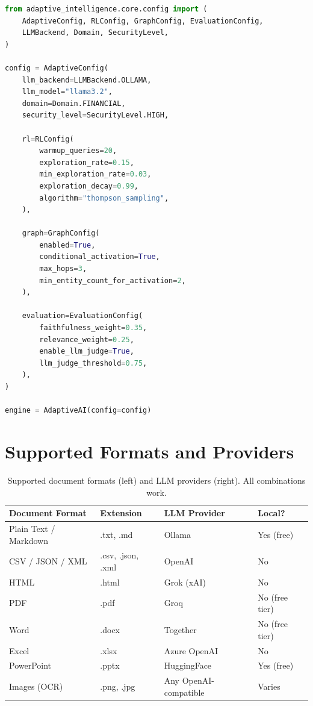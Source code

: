 \documentclass[11pt]{article}
\begin{document}
\begin{lstlisting}[language=Python, caption={Full configuration control (Level 2 access).}]
from adaptive_intelligence.core.config import (
    AdaptiveConfig, RLConfig, GraphConfig, EvaluationConfig,
    LLMBackend, Domain, SecurityLevel,
)

config = AdaptiveConfig(
    llm_backend=LLMBackend.OLLAMA,
    llm_model="llama3.2",
    domain=Domain.FINANCIAL,
    security_level=SecurityLevel.HIGH,
    
    rl=RLConfig(
        warmup_queries=20,
        exploration_rate=0.15,
        min_exploration_rate=0.03,
        exploration_decay=0.99,
        algorithm="thompson_sampling",
    ),
    
    graph=GraphConfig(
        enabled=True,
        conditional_activation=True,
        max_hops=3,
        min_entity_count_for_activation=2,
    ),
    
    evaluation=EvaluationConfig(
        faithfulness_weight=0.35,
        relevance_weight=0.25,
        enable_llm_judge=True,
        llm_judge_threshold=0.75,
    ),
)

engine = AdaptiveAI(config=config)
\end{lstlisting}

\section{Supported Formats and Providers}
\label{app:formats}

\begin{table}[H]
    \centering
    \small
    \begin{tabular}{@{}llll@{}}
        \toprule
        \textbf{Document Format} & \textbf{Extension} & \textbf{LLM Provider} & \textbf{Local?} \\
        \midrule
        Plain Text / Markdown & .txt, .md & Ollama & Yes (free) \\
        CSV / JSON / XML      & .csv, .json, .xml & OpenAI & No \\
        HTML                  & .html & Grok (xAI) & No \\
        PDF                   & .pdf & Groq & No (free tier) \\
        Word                  & .docx & Together & No (free tier) \\
        Excel                 & .xlsx & Azure OpenAI & No \\
        PowerPoint            & .pptx & HuggingFace & Yes (free) \\
        Images (OCR)          & .png, .jpg & Any OpenAI-compatible & Varies \\
        \bottomrule
    \end{tabular}
    \caption{Supported document formats (left) and LLM providers (right). All combinations work.}
    \label{tab:formats}
\end{table}
\end{document}
